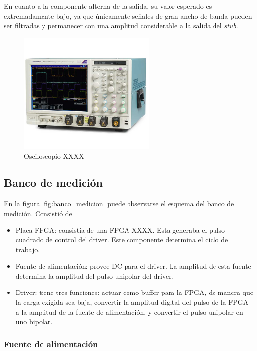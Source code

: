 En cuanto a la componente alterna de la salida, su valor esperado es
extremadamente bajo, ya que únicamente señales de gran ancho de banda pueden ser
filtradas y permanecer con una amplitud considerable a la salida del 
\textit{stub}.

\begin{figure}
  \centering
    \includegraphics[width=0.6\textwidth]{images/osciloscopio.png}
    \caption{Osciloscopio XXXX}
    \label{fig:osciloscopio}
\end{figure}

\subsection{Banco de medición}

En la figura \ref{fig:banco_medicion} puede observarse el esquema del banco de
medición. Consistió de

\begin{itemize}
    \item{Placa FPGA: consistía de una FPGA XXXX. Esta generaba el pulso
        cuadrado de control del driver. Este componente determina el ciclo de
        trabajo.}
    \item{Fuente de alimentación: provee DC para el driver. La amplitud de esta
        fuente determina la amplitud del pulso unipolar del driver.}
    \item{Driver: tiene tres funciones: actuar como buffer para la FPGA, de
        manera que la carga exigida sea baja, convertir la amplitud digital del
        pulso de la FPGA a la amplitud de la fuente de alimentación, y convertir
        el pulso unipolar en uno bipolar.}
\end{itemize}

\subsubsection{Fuente de alimentación}

